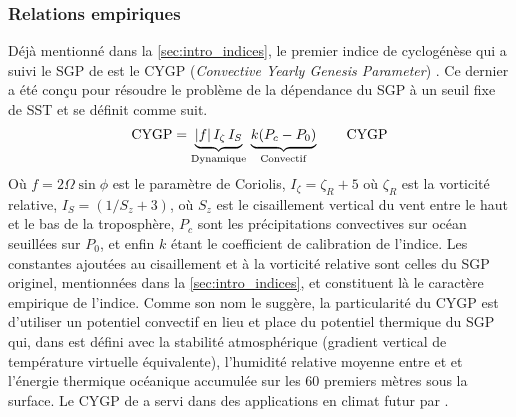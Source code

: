 \documentclass[../main.tex]{subfiles}
\begin{document}
\subsubsection{Relations empiriques}\label{sec:relations_empiriques}

Déjà mentionné dans la \cref{sec:intro_indices}, le premier indice de cyclogénèse qui a suivi le SGP de \citeauthor{gray_tropical_1975} est le CYGP
(\textit{Convective Yearly Genesis Parameter}) \parencite{royer_gcm_1998}. Ce dernier a été conçu pour résoudre le problème de la dépendance du SGP à un seuil
fixe de SST et se définit comme suit.
%
\begin{equation*} \mathrm{CYGP} = \underbrace{\lvert f \rvert \, I_\zeta \, I_S}_{\mathrm{Dynamique}} \, \underbrace{\vphantom{I_\zeta}k(P_c -
P_0)}_{\mathrm{Convectif}} \tag*{CYGP}
\end{equation*}
%
Où $f = 2 \Omega \sin \phi$ est le paramètre de Coriolis, $I_\zeta = \zeta_R \! +\! 5$ où $\zeta_R$ est la vorticité relative, $I_S = (1/S_z \! + \! 3)$, où
$S_z$ est le cisaillement vertical du vent entre le haut et le bas de la troposphère, $P_c$ sont les précipitations convectives sur océan seuillées sur $P_0$,
et enfin $k$ étant le coefficient de calibration de l'indice. Les constantes ajoutées au cisaillement et à la vorticité relative sont celles du SGP originel,
mentionnées dans la \cref{sec:intro_indices}, et constituent là le caractère empirique de l'indice. Comme son nom le suggère, la particularité
du CYGP est d'utiliser un potentiel convectif en lieu et place du potentiel thermique du SGP qui, dans \textcite{gray_tropical_1975} est défini avec la
stabilité atmosphérique (gradient vertical de température virtuelle équivalente), l'humidité relative moyenne entre  et  et l'énergie
thermique océanique accumulée sur les 60 premiers mètres sous la surface. Le CYGP de \citeauthor{royer_gcm_1998} a servi dans des applications en climat futur
par \textcite{mcdonald_tropical_2005,cattiaux_projected_2020,chauvin_response_2006,chauvin_future_2020}.
\end{document}
